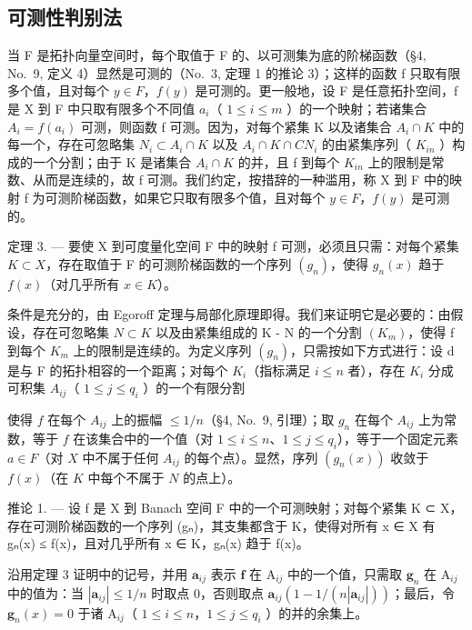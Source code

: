 \subsection{可测性判别法}

当 F 是拓扑向量空间时，每个取值于 F 的、以可测集为底的阶梯函数（§4, No.~9, 定义 4）显然是可测的（No.~3, 定理 1 的推论 3）；这样的函数 f 只取有限多个值，且对每个 \(y \in F\)，\(f(y)\) 是可测的。更一般地，设 F 是任意拓扑空间，f 是 X 到 F 中只取有限多个不同值 \(a_i\)（ \(1 \leqslant i \leqslant m\) ）的一个映射；若诸集合 \(A_i = f(a_i)\) 可测，则函数 f 可测。因为，对每个紧集 K 以及诸集合 \(A_i \cap K\) 中的每一个，存在可忽略集 \(N_i \subset A_i \cap K\) 以及 \(A_i \cap K \cap C N_i\) 的由紧集序列（ \(K_{in}\) ）构成的一个分割；由于 K 是诸集合 \(A_i \cap K\) 的并，且 f 到每个 \(K_{in}\) 上的限制是常数、从而是连续的，故 f 可测。我们约定，按措辞的一种滥用，称 X 到 F 中的映射 f 为可测阶梯函数，如果它只取有限多个值，且对每个 \(y \in F\)，\(f(y)\) 是可测的。

定理 3. --- 要使 X 到可度量化空间 F 中的映射 f 可测，必须且只需：对每个紧集 \(K \subset X\)，存在取值于 F 的可测阶梯函数的一个序列 \((g_{n})\)，使得 \(g_{n}(x)\) 趋于 \(f(x)\)（对几乎所有 \(x \in K\)）。

条件是充分的，由 Egoroff 定理与局部化原理即得。我们来证明它是必要的：由假设，存在可忽略集 \(N \subset K\) 以及由紧集组成的 K - N 的一个分割 \((K_{m})\)，使得 f 到每个 \(K_{m}\) 上的限制是连续的。为定义序列 \((g_{n})\)，只需按如下方式进行：设 d 是与 F 的拓扑相容的一个距离；对每个 \(K_{i}\)（指标满足 \(i \leqslant n\) 者），存在 \(K_{i}\) 分成可积集 \(A_{ij}\)（ \(1 \leqslant j \leqslant q_{i}\) ）的一个有限分割

使得 \(f\) 在每个 \(A_{ij}\) 上的振幅 \(\leqslant 1/n\)（§4, No.~9, 引理）；取 \(g_n\) 在每个 \(A_{ij}\) 上为常数，等于 \(f\) 在该集合中的一个值（对 \(1 \leqslant i \leqslant n\)、\(1 \leqslant j \leqslant q_i\)），等于一个固定元素 \(a \in F\)（对 \(X\) 中不属于任何 \(A_{ij}\) 的每个点）。显然，序列 \((g_n(x))\) 收敛于 \(f(x)\)（在 \(K\) 中每个不属于 \(N\) 的点上）。

推论 1. --- 设 f 是 X 到 Banach 空间 F 中的一个可测映射；对每个紧集 K ⊂ X，存在可测阶梯函数的一个序列 (gₙ)，其支集都含于 K，使得对所有 x ∈ X 有 \textbar gₙ(x)\textbar{} ≤ \textbar f(x)\textbar{}，且对几乎所有 x ∈ K，gₙ(x) 趋于 f(x)。

沿用定理 3 证明中的记号，并用 \(\mathbf{a}_{ij}\) 表示 \(\mathbf{f}\) 在 \(\mathrm{A}_{ij}\) 中的一个值，只需取 \(\mathbf{g}_n\) 在 \(\mathrm{A}_{ij}\) 中的值为：当 \(|\mathbf{a}_{ij}| \leqslant 1/n\) 时取点 0，否则取点 \(\mathbf{a}_{ij}(1 - 1/(n|\mathbf{a}_{ij}|))\)；最后，令 \(\mathbf{g}_n(x) = 0\) 于诸 \(\mathrm{A}_{ij}\)（ \(1 \leqslant i \leqslant n\)，\(1 \leqslant j \leqslant q_i\) ）的并的余集上。

